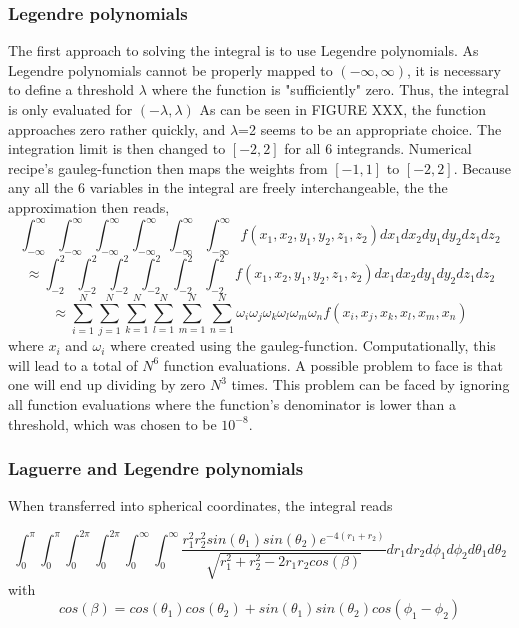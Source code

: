 \documentclass[10pt,a4paper]{article}
\begin{document}
\subsubsection{Legendre polynomials}
The first approach to solving the integral is to use Legendre polynomials. As Legendre polynomials cannot be properly mapped to $(-\infty,\infty)$, it is necessary to define a threshold $\lambda$ where the function is "sufficiently" zero. Thus, the integral is only evaluated for $(-\lambda,\lambda)$ As can be seen in FIGURE XXX, the function approaches zero rather quickly, and $\lambda$=2 seems to be an appropriate choice. The integration limit is then changed to $[-2,2]$ for all 6 integrands. Numerical recipe's gauleg-function \cite{press1992numerical} then maps the weights from $[-1,1]$ to $[-2,2]$. Because any all the 6 variables in the integral are freely interchangeable, the the approximation then reads, 
$$\int_{-\infty}^{\infty}\int_{-\infty}^{\infty}\int_{-\infty}^{\infty}\int_{-\infty}^{\infty}\int_{-\infty}^{\infty}\int_{-\infty}^{\infty}f(x_1,x_2,y_1,y_2,z_1,z_2)dx_1dx_2dy_1dy_2dz_1dz_2$$
$$\approx\int_{-2}^{2}\int_{-2}^{2}\int_{-2}^{2}\int_{-2}^{2}\int_{-2}^{2}\int_{-2}^{2}f(x_1,x_2,y_1,y_2,z_1,z_2)dx_1dx_2dy_1dy_2dz_1dz_2 $$
$$\approx\sum_{i=1}^{N}\sum_{j=1}^{N}\sum_{k=1}^{N}\sum_{l=1}^{N}\sum_{m=1}^{N}\sum_{n=1}^{N}\omega_i\omega_j\omega_k\omega_l\omega_m\omega_nf(x_i,x_j,x_k,x_l,x_m,x_n)$$
where $x_i$ and $\omega_i$ where created using the gauleg-function. 
Computationally, this will lead to a total of $N^6$ function evaluations. A possible problem to face is that one will end up dividing by zero $N^3$ times. This problem can be faced by ignoring all function evaluations where the function's denominator is lower than a threshold, which was chosen to be $10^{-8}.$
\subsubsection{Laguerre and Legendre polynomials}
When transferred into spherical coordinates, the integral reads 

$$
\int_{0}^{\pi}\int_{0}^{\pi}\int_{0}^{2\pi}\int_{0}^{2\pi}\int_{0}^{\infty}\int_{0}^{\infty}
\frac{r_1^2r_2^2sin(\theta_1)sin(\theta_2)e^{-4(r_1+r_2)}}{\sqrt{r_1^2+r_2^2-2r_1r_2cos(\beta)}}dr_1dr_2d\phi_1d\phi_2d\theta_1d\theta_2
$$
with
$$
cos(\beta)=cos(\theta_1)cos(\theta_2)+sin(\theta_1)sin(\theta_2)cos(\phi_1-\phi_2)
$$
\end{document}
